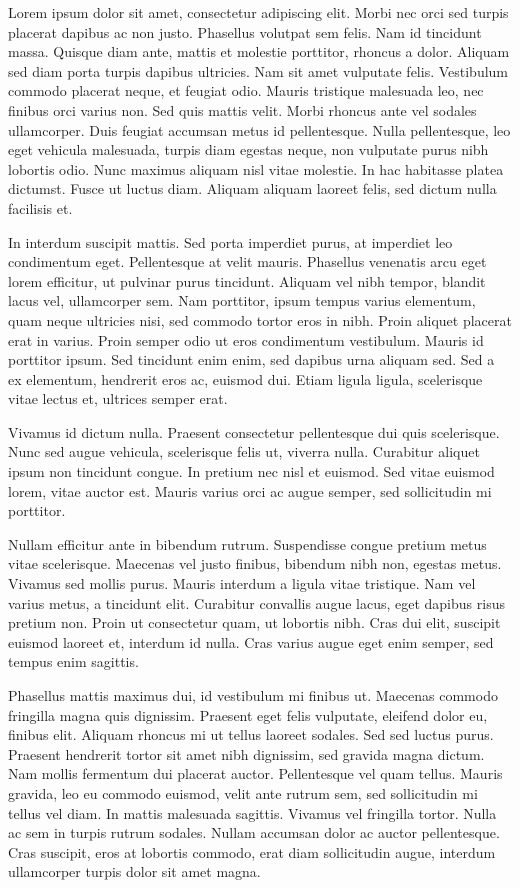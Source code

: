 \documentclass[conference]{IEEEtran}
\begin{document}
Lorem ipsum dolor sit amet, consectetur adipiscing elit. Morbi nec orci sed turpis placerat dapibus ac non justo. Phasellus volutpat sem felis. Nam id tincidunt massa. Quisque diam ante, mattis et molestie porttitor, rhoncus a dolor. Aliquam sed diam porta turpis dapibus ultricies. Nam sit amet vulputate felis. Vestibulum commodo placerat neque, et feugiat odio. Mauris tristique malesuada leo, nec finibus orci varius non. Sed quis mattis velit. Morbi rhoncus ante vel sodales ullamcorper. Duis feugiat accumsan metus id pellentesque. Nulla pellentesque, leo eget vehicula malesuada, turpis diam egestas neque, non vulputate purus nibh lobortis odio. Nunc maximus aliquam nisl vitae molestie. In hac habitasse platea dictumst. Fusce ut luctus diam. Aliquam aliquam laoreet felis, sed dictum nulla facilisis et.

In interdum suscipit mattis. Sed porta imperdiet purus, at imperdiet leo condimentum eget. Pellentesque at velit mauris. Phasellus venenatis arcu eget lorem efficitur, ut pulvinar purus tincidunt. Aliquam vel nibh tempor, blandit lacus vel, ullamcorper sem. Nam porttitor, ipsum tempus varius elementum, quam neque ultricies nisi, sed commodo tortor eros in nibh. Proin aliquet placerat erat in varius. Proin semper odio ut eros condimentum vestibulum. Mauris id porttitor ipsum. Sed tincidunt enim enim, sed dapibus urna aliquam sed. Sed a ex elementum, hendrerit eros ac, euismod dui. Etiam ligula ligula, scelerisque vitae lectus et, ultrices semper erat.

Vivamus id dictum nulla. Praesent consectetur pellentesque dui quis scelerisque. Nunc sed augue vehicula, scelerisque felis ut, viverra nulla. Curabitur aliquet ipsum non tincidunt congue. In pretium nec nisl et euismod. Sed vitae euismod lorem, vitae auctor est. Mauris varius orci ac augue semper, sed sollicitudin mi porttitor.

Nullam efficitur ante in bibendum rutrum. Suspendisse congue pretium metus vitae scelerisque. Maecenas vel justo finibus, bibendum nibh non, egestas metus. Vivamus sed mollis purus. Mauris interdum a ligula vitae tristique. Nam vel varius metus, a tincidunt elit. Curabitur convallis augue lacus, eget dapibus risus pretium non. Proin ut consectetur quam, ut lobortis nibh. Cras dui elit, suscipit euismod laoreet et, interdum id nulla. Cras varius augue eget enim semper, sed tempus enim sagittis.

Phasellus mattis maximus dui, id vestibulum mi finibus ut. Maecenas commodo fringilla magna quis dignissim. Praesent eget felis vulputate, eleifend dolor eu, finibus elit. Aliquam rhoncus mi ut tellus laoreet sodales. Sed sed luctus purus. Praesent hendrerit tortor sit amet nibh dignissim, sed gravida magna dictum. Nam mollis fermentum dui placerat auctor. Pellentesque vel quam tellus. Mauris gravida, leo eu commodo euismod, velit ante rutrum sem, sed sollicitudin mi tellus vel diam. In mattis malesuada sagittis. Vivamus vel fringilla tortor. Nulla ac sem in turpis rutrum sodales. Nullam accumsan dolor ac auctor pellentesque. Cras suscipit, eros at lobortis commodo, erat diam sollicitudin augue, interdum ullamcorper turpis dolor sit amet magna. 
\end{document}
